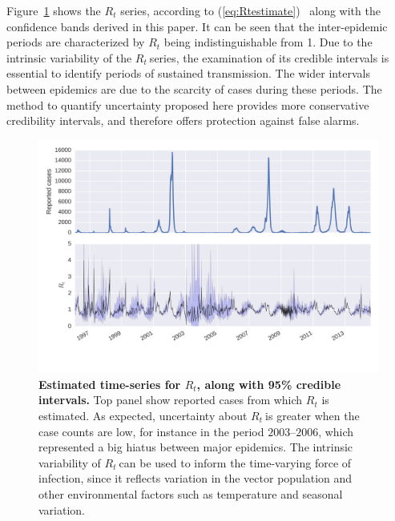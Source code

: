 \documentclass[10pt]{article}
\def \rr {$R_{t}\:$}
\begin{document}
Figure~\ref{fig:rtseries}  shows the $R_t$ series, according to 
(\ref{eq:Rtestimate})~\cite{nishiura} along with the confidence bands derived 
in this paper. 
It can be seen that the inter-epidemic periods are characterized by $R_t$ being 
indistinguishable from 1.
Due to the intrinsic variability of the \rr series, the examination of its 
credible intervals is essential to identify periods of sustained transmission.
The wider intervals between epidemics are due to the scarcity of cases during 
these periods.
The method to quantify uncertainty proposed here provides more conservative 
credibility intervals, and therefore offers protection against false alarms.

\begin{center}
\begin{figure}[!h]
 \centering
 \includegraphics[width=16cm]{./plots/rt_series.png}
 \caption{{\bf Estimated time-series for $R_t$, along with 95\% credible 
intervals.} Top panel show reported cases from which $R_t$ is estimated.
As expected, uncertainty about \rr is greater when the case counts are low, for 
instance in the period $2003$--$2006$, which represented a big hiatus between 
major epidemics.
The intrinsic variability of \rr can be used to inform the time-varying force 
of infection, since it reflects variation in the vector population and other 
environmental factors such as temperature and seasonal variation.}
\label{fig:rtseries}
\end{figure}
\end{center}
\end{document}
